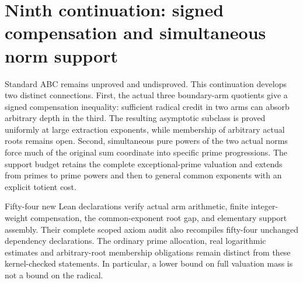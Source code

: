 \section{Ninth continuation: signed compensation and simultaneous norm support}

Standard ABC remains unproved and undisproved. This continuation develops
two distinct connections. First, the actual three boundary-arm quotients
give a signed compensation inequality: sufficient radical credit in two
arms can absorb arbitrary depth in the third. The resulting asymptotic
subclass is proved uniformly at large extraction exponents, while membership
of arbitrary actual roots remains open. Second, simultaneous pure powers
of the two actual norms force much of the original sum coordinate into
specific prime progressions. The support budget retains the complete
exceptional-prime valuation and extends from primes to prime powers and
then to general common exponents with an explicit totient cost.

Fifty-four new Lean declarations verify actual arm arithmetic, finite
integer-weight compensation, the common-exponent root gap, and elementary
support assembly. Their complete scoped axiom audit also recompiles
fifty-four unchanged dependency declarations. The ordinary prime allocation,
real logarithmic estimates and arbitrary-root membership obligations remain
distinct from these kernel-checked statements. In particular, a lower bound
on full valuation mass is not a bound on the radical.
